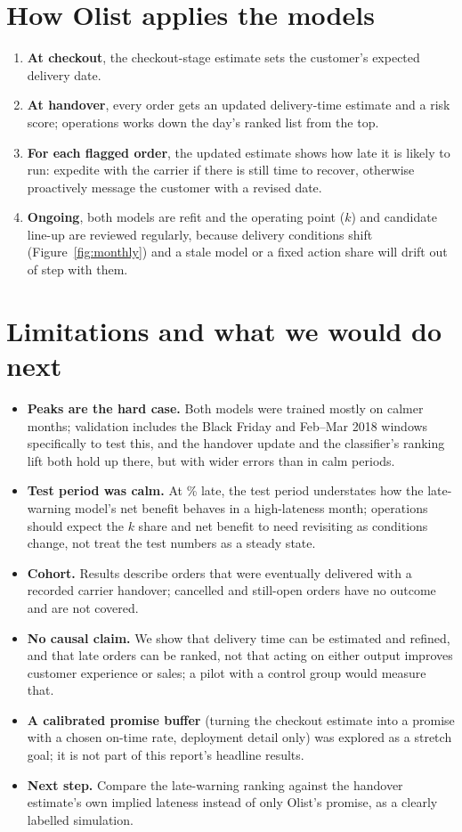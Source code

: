 \documentclass[12pt,a4paper]{article}
\begin{document}
\section*{How Olist applies the models}
\begin{enumerate}\setlength{\itemsep}{0pt}
\item \textbf{At checkout}, the checkout-stage estimate sets the customer's expected delivery date.
\item \textbf{At handover}, every order gets an updated delivery-time estimate and a risk score; operations works down the day's ranked list from the top.
\item \textbf{For each flagged order}, the updated estimate shows how late it is likely to run: expedite with the carrier if there is still time to recover, otherwise proactively message the customer with a revised date.
\item \textbf{Ongoing}, both models are refit and the operating point (\(k\)) and candidate line-up are reviewed regularly, because delivery conditions shift (Figure~\ref{fig:monthly}) and a stale model or a fixed action share will drift out of step with them.
\end{enumerate}

\section*{Limitations and what we would do next}
\begin{itemize}\setlength{\itemsep}{0pt}
\item \textbf{Peaks are the hard case.} Both models were trained mostly on calmer months; validation includes the Black Friday and Feb--Mar 2018 windows specifically to test this, and the handover update and the classifier's ranking lift both hold up there, but with wider errors than in calm periods.
\item \textbf{Test period was calm.} At \ClsTestLate{}\% late, the test period understates how the late-warning model's net benefit behaves in a high-lateness month; operations should expect the \(k\) share and net benefit to need revisiting as conditions change, not treat the test numbers as a steady state.
\item \textbf{Cohort.} Results describe orders that were eventually delivered with a recorded carrier handover; cancelled and still-open orders have no outcome and are not covered.
\item \textbf{No causal claim.} We show that delivery time can be estimated and refined, and that late orders can be ranked, not that acting on either output improves customer experience or sales; a pilot with a control group would measure that.
\item \textbf{A calibrated promise buffer} (turning the checkout estimate into a promise with a chosen on-time rate, deployment detail only) was explored as a stretch goal; it is not part of this report's headline results.
\item \textbf{Next step.} Compare the late-warning ranking against the handover estimate's own implied lateness instead of only Olist's promise, as a clearly labelled simulation.
\end{itemize}
\end{document}
